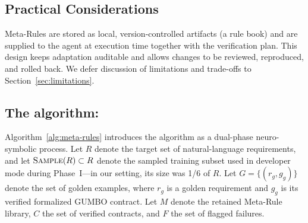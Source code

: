 \documentclass[conference]{IEEEtran}
\begin{document}
\subsection{Practical Considerations}
Meta-Rules are stored as local, version-controlled artifacts (a rule book) and are supplied to the agent at execution time together with the verification plan. This design keeps adaptation auditable and allows changes to be reviewed, reproduced, and rolled back. We defer discussion of limitations and trade-offs to Section~\ref{sec:limitations}.

\subsection{The algorithm:}
Algorithm~\ref{alg:meta-rules} introduces the algorithm as a dual-phase neuro-symbolic process. Let $R$ denote the target set of natural-language requirements, and let $\textsc{Sample}(R)\subset R$ denote the sampled training subset used in developer mode during Phase~I---in our setting, its size was 1/6 of $R$. Let $G=\{(r_g,g_g)\}$ denote the set of golden examples, where $r_g$ is a golden requirement and $g_g$ is its verified formalized GUMBO contract. Let $M$ denote the retained Meta-Rule library, $C$ the set of verified contracts, and $F$ the set of flagged failures.
\end{document}
